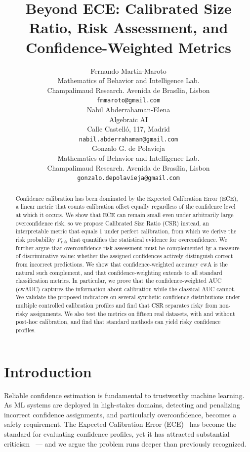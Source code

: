 \documentclass{article}
\title{Beyond ECE: Calibrated Size Ratio, Risk Assessment, and Confidence-Weighted Metrics}
\author{ 
Fernando Martin-Maroto \\ Mathematics of Behavior and Intelligence Lab.  \\ Champalimaud Research. Avenida de Brasília, Lisbon  \\  \texttt{fmmaroto@gmail.com} \\ 
\And
Nabil Abderrahaman-Elena  \\ Algebraic AI \\ Calle Castelló, 117, Madrid \\  \texttt{nabil.abderrahaman@gmail.com} \\ 
\And
Gonzalo G. de Polavieja \\ Mathematics of Behavior and Intelligence Lab. \\ Champalimaud Research. Avenida de Brasília, Lisbon  \\  \texttt{gonzalo.depolavieja@gmail.com} \\ 
}
\theoremstyle{plain}
\theoremstyle{definition}
\theoremstyle{remark}
\begin{document}
\maketitle


\begin{abstract}
Confidence calibration has been dominated by the Expected Calibration Error (ECE), a linear metric that counts calibration offset equally regardless of the confidence level at which it occurs. We show that ECE can remain small even under arbitrarily large overconfidence risk, so we propose Calibrated Size Ratio (CSR) instead, an interpretable metric that equals 1 under perfect calibration, from which we derive the risk probability $P_{\mathrm{risk}}$ that quantifies the statistical evidence for overconfidence. We further argue that overconfidence risk assessment must be complemented by a measure of discriminative value: whether the assigned confidences actively distinguish correct from incorrect predictions. We show that confidence-weighted accuracy $\mathrm{cwA}$ is the natural such complement, and that confidence-weighting extends to all standard classification metrics. In particular, we prove that the confidence-weighted AUC (cwAUC) captures the information about calibration while the classical AUC cannot. We validate the proposed indicators on several synthetic confidence distributions under multiple controlled calibration profiles and find that CSR separates risky from non-risky assignments. We also test the metrics on fifteen real datasets, with and without post-hoc calibration, and find that standard methods can yield risky confidence profiles.
\end{abstract}

\section{Introduction}

Reliable confidence estimation is fundamental to trustworthy machine learning. As ML systems are deployed in high-stakes domains, detecting and penalizing incorrect confidence assignments, and particularly overconfidence, becomes a safety requirement. The Expected Calibration Error (ECE)~\cite{guo2017calibration} has become the standard for evaluating confidence profiles, yet it has attracted substantial criticism~\cite{chidambaram2024flawed} — and we argue the problem runs deeper than previously recognized.
\end{document}
